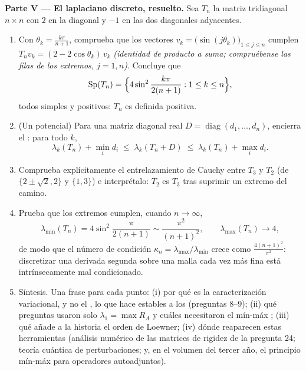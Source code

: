 \begin{problem}
\medskip
\noindent\textbf{Parte V --- El laplaciano discreto, resuelto.} Sea
$T_n$ la matriz tridiagonal $n \times n$ con $2$ en la diagonal y
$-1$ en las dos diagonales adyacentes.
\begin{enumerate}[resume]
  \item Con $\theta_k = \frac{k\pi}{n+1}$, comprueba que los
        vectores $v_k = \bigl(\sin(j\theta_k)\bigr)_{1\leq j\leq n}$
        cumplen $T_nv_k = (2 - 2\cos\theta_k)\,v_k$ \emph{(identidad
        de producto a suma; compruébense las filas de los extremos,
        $j = 1, n$)}. Concluye que
        \[
        \operatorname{Sp}(T_n) = \Bigl\{4\sin^2
        \frac{k\pi}{2(n+1)} : 1 \leq k \leq n\Bigr\},
        \]
        todos simples y positivos: $T_n$ es definida positiva.
  \item (Un potencial) Para una matriz diagonal real $D =
        \operatorname{diag}(d_1, \dots, d_n)$, encierra el
        : para todo $k$,
        \[
        \lambda_k(T_n) + \min_i d_i \;\leq\;
        \lambda_k(T_n + D) \;\leq\; \lambda_k(T_n) + \max_i
        d_i .
        \]
  \item Comprueba explícitamente el entrelazamiento de Cauchy entre
        $T_3$ y $T_2$ (de  $\{2 \pm \sqrt2, 2\}$ y $\{1,
        3\}$) e interprétalo: $T_2$ es $T_3$ tras suprimir un
        extremo del camino.
  \item Prueba que los  extremos cumplen, cuando $n
        \to \infty$,
        \[
        \lambda_{\min}(T_n) = 4\sin^2\frac{\pi}{2(n+1)}
        \sim \frac{\pi^2}{(n+1)^2},
        \qquad
        \lambda_{\max}(T_n) \to 4 ,
        \]
        de modo que el número de condición $\kappa_n =
        \lambda_{\max}/\lambda_{\min}$ crece como
        $\frac{4(n+1)^2}{\pi^2}$: discretizar una derivada segunda
        sobre una malla cada vez más fina está intrínsecamente mal
        condicionado.
  \item Síntesis. Una frase para cada punto: (i) por qué es la
        caracterización variacional, y no el , lo que hace estables a los
         (preguntas 8--9); (ii) qué preguntas usaron
        solo $\lambda_1 = \max R_A$ y cuáles necesitaron el mín-máx
        ; (iii) qué añade a la historia el orden de Loewner;
        (iv) dónde reaparecen estas herramientas (análisis numérico
        de las matrices de rigidez de la pregunta 24; teoría
        cuántica de perturbaciones; y, en el volumen del tercer año,
        el principio mín-máx para operadores 
        autoadjuntos).
\end{enumerate}
\end{problem}
